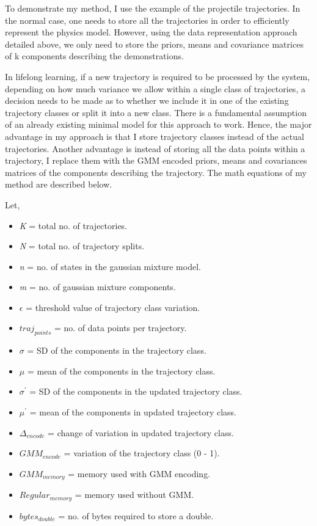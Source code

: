 \documentclass[conference]{IEEEtran}
\begin{document}
To demonstrate my method, I use the example of the projectile trajectories. In the normal case, one needs to store all the trajectories in order to efficiently represent the physics model. However, using the data representation approach detailed above, we only need to store the priors, means and covariance matrices of k components describing the demonstrations. 

In lifelong learning, if a new trajectory is required to be processed by the system, depending on how much variance we allow within a single class of trajectories, a decision needs to be made as to whether we include it in one of the existing trajectory classes or split it into a new class. There is a fundamental assumption of an already existing minimal model for this approach to work. Hence, the major advantage in my approach is that I store trajectory classes instead of the actual trajectories. Another advantage is instead of storing all the data points within a trajectory, I replace them with the GMM encoded priors, means and covariances matrices of the components describing the trajectory. The math equations of my method are described below.

Let,

\begin {itemize}
\item[]{\textit{K} = total no. of trajectories.}
\item[]{\textit{N} = total no. of trajectory splits.}
\item[]{\textit{n} = no. of states in the gaussian mixture model.}
\item[]{\textit{m} = no. of gaussian mixture components.}
\item[]{\textit{$\epsilon$} = threshold value of trajectory class variation.}
\item[]{\textit{$traj_{points}$} = no. of data points per trajectory.} 
\item[]{\textit{$\sigma$} = SD of the components in the trajectory class.} 
\item[]{\textit{$\mu$} = mean of the components in the trajectory class.} 
\item[]{\textit{$\sigma^\prime$} = SD of the components in the updated trajectory class.} 
\item[]{\textit{$\mu^\prime$} = mean of the components in updated trajectory class.} 
\item[]{\textit{$\Delta_{encode}$} = change of variation in updated trajectory class.} 
\item[]{\textit{$GMM_{encode}$} = variation of the trajectory class (0 - 1).} 
\item[]{\textit{$GMM_{memory}$} = memory used with GMM encoding.} 
\item[]{\textit{$Regular_{memory}$} = memory used without GMM.} 
\item[]{\textit{$bytes_{double}$} = no. of bytes required to store a double.} 
\end {itemize}
\end{document}
